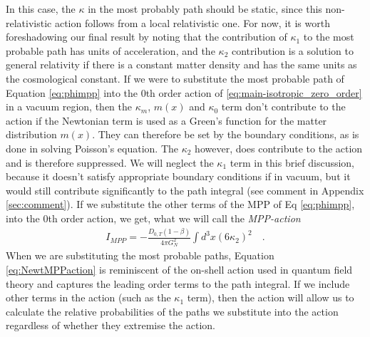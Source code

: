 \documentclass[aps,pra,amsmath,amssymb,amsthm,floatfix,nofootinbib,notitlepage,superscriptaddress,10pt]{revtex4-2}
\begin{document}
 
In this case, the $\kappa$ in the most probably path should be static, since this non-relativistic action follows from a local relativistic one. For now, it is worth foreshadowing our final result by noting that the contribution of $\kappa_1$ to the most probable path has units  of acceleration, and the $\kappa_2$ contribution is a solution to general relativity if there is a constant matter density and has the same units as the cosmological constant.
If we were to substitute the most probable path of Equation \eqref{eq:phimpp} into the 0th order action of \eqref{eq:main-isotropic_zero_order} in a vacuum region, then the $\kappa_m$, $m(x)$ and $\kappa_0$ term don't contribute to the action if the Newtonian term is used as a Green's function for the matter distribution $m(x)$. They can therefore be set by the boundary conditions, as is done in solving Poisson's equation. The $\kappa_2$ however, does contribute to the action and is therefore suppressed. We will neglect the $\kappa_1$ term in this brief discussion, because it doesn't satisfy appropriate boundary conditions if in vacuum, but it would still contribute significantly to the path integral (see comment in Appendix \ref{sec:comment}). If we substitute the other terms of the MPP of Eq \eqref{eq:phimpp}, into the 0th order action, we get, what we will call the {\it MPP-action}
\begin{align}
    I_{MPP}=-\frac{D_{0,T} (1-\beta)}{4\pi G_N^2}\int d^3x\left(6\kappa_2   \right)^2\quad.
    \label{eq:NewtMPPaction}
\end{align}
 When we are substituting the most probable paths, Equation \eqref{eq:NewtMPPaction} is reminiscent of the on-shell action used in quantum field theory and captures the leading order terms to the path integral. If we include other terms in the action  (such as the $\kappa_1$ term), then the action will allow us to calculate the relative probabilities of the paths we substitute into the action regardless of whether they extremise the action. 
\end{document}
